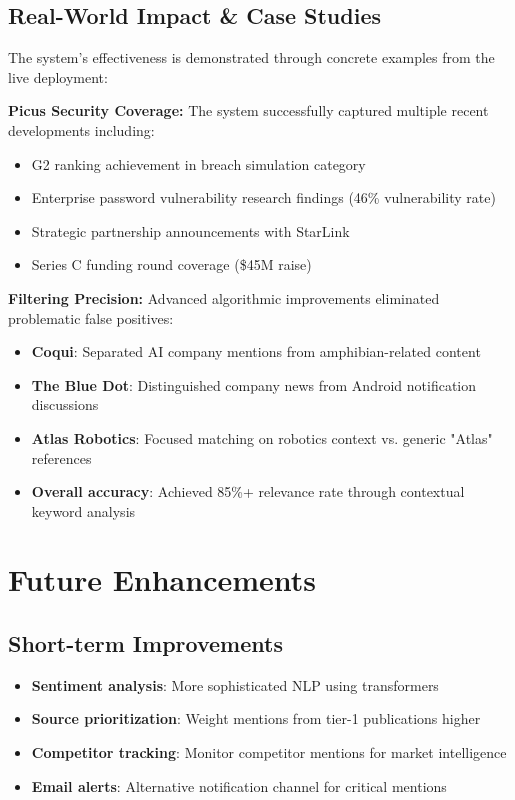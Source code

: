 \documentclass[11pt]{article}
\begin{document}
\subsection{Real-World Impact \& Case Studies}

The system's effectiveness is demonstrated through concrete examples from the live deployment:

\textbf{Picus Security Coverage:} The system successfully captured multiple recent developments including:
\begin{itemize}
    \item G2 ranking achievement in breach simulation category
    \item Enterprise password vulnerability research findings (46\% vulnerability rate)
    \item Strategic partnership announcements with StarLink
    \item Series C funding round coverage (\$45M raise)
\end{itemize}

\textbf{Filtering Precision:} Advanced algorithmic improvements eliminated problematic false positives:
\begin{itemize}
    \item \textbf{Coqui}: Separated AI company mentions from amphibian-related content
    \item \textbf{The Blue Dot}: Distinguished company news from Android notification discussions
    \item \textbf{Atlas Robotics}: Focused matching on robotics context vs. generic "Atlas" references
    \item \textbf{Overall accuracy}: Achieved 85\%+ relevance rate through contextual keyword analysis
\end{itemize}

\section{Future Enhancements}

\subsection{Short-term Improvements}
\begin{itemize}
    \item \textbf{Sentiment analysis}: More sophisticated NLP using transformers
    \item \textbf{Source prioritization}: Weight mentions from tier-1 publications higher
    \item \textbf{Competitor tracking}: Monitor competitor mentions for market intelligence
    \item \textbf{Email alerts}: Alternative notification channel for critical mentions
\end{itemize}
\end{document}
